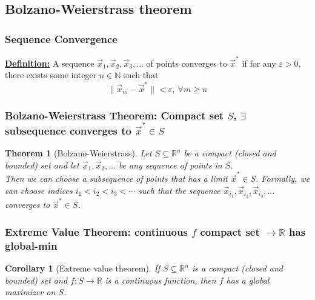 \documentclass[11pt,a4paper]{article}
\newtheorem{theorem}{Theorem}
\newtheorem{corollary}{Corollary}
\begin{document}
\subsection{Bolzano-Weierstrass theorem}
\subsubsection{Sequence Convergence}
\textbf{\underline{Definition:}} A sequence $\vec{x}_1,\vec{x}_2,\vec{x}_3,...$ of points converges to $\vec{x}^*$ if for any $\varepsilon>0$, there exists some integer $n\in \mathbb{N}$ such that $$\|\vec{x}_m-\vec{x}^*\|<\varepsilon,\ \forall m\geq n$$

\subsubsection{Bolzano-Weierstrass Theorem: Compact set $S$, $\exists$ subsequence converges to $\vec{x}^*\in S$}
\begin{theorem}[Bolzano-Weierstrass]
    Let $S\subseteq \mathbb{R}^n$ be a compact (closed and bounded) set and let $\vec{x}_1,\vec{x}_2,...$ be any sequence of points in $S$.\\
    Then we can choose a subsequence of points that has a limit $\vec{x}^*\in S$. Formally, we can choose indices $i_1<i_2<i_3<\cdots$ such that the sequence $\vec{x}_{i_1},\vec{x}_{i_2},\vec{x}_{i_3},...$ converges to $\vec{x}^*\in S$.
\end{theorem}
\begin{center}
\end{center}

\subsubsection{Extreme Value Theorem: continuous $f$ compact set $\rightarrow \mathbb{R}$ has global-min}
\begin{corollary}[Extreme value theorem]
    If $S\subseteq \mathbb{R}^n$ is a compact (closed and bounded) set and $f: S \rightarrow \mathbb{R}$ is a continuous function, then $f$ has a global maximizer on $S$.
\end{corollary}
\end{document}
